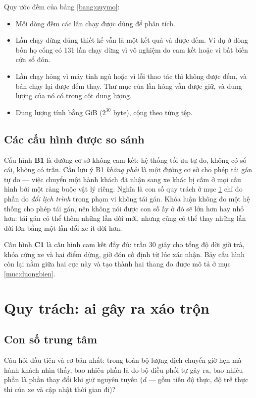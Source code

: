 Quy ước đếm của bảng \ref{bang:quymo}:
\begin{itemize}
\item Mỗi dòng đếm các lần chạy được dùng để phân tích.
\item Lần chạy dừng đúng thiết kế vẫn là một kết quả và được đếm. Ví dụ ở dòng bốn họ cổng có 131 lần
chạy dừng vì vô nghiệm do cam kết hoặc vì bất biến cửa sổ đón.
\item Lần chạy hỏng vì máy tính ngủ hoặc vì lỗi thao tác thì không được đếm, và bản chạy lại được đếm
thay. Thư mục của lần hỏng vẫn được giữ, và dung lượng của nó có trong cột dung lượng.
\item Dung lượng tính bằng GiB ($2^{30}$ byte), cộng theo từng tệp.
\end{itemize}

\subsection{Các cấu hình được so sánh}

Cấu hình \textbf{B1} là đường cơ sở không cam kết: hệ thống tối ưu tự do, không có sổ cái, không
có trần. Cần lưu ý B1 \emph{không phải} là một đường cơ sở cho phép tái gán tự do --- việc
chuyển một hành khách đã nhận sang xe khác bị cấm ở mọi cấu hình bởi một ràng buộc vật lý riêng.
Nghĩa là con số quy trách ở mục \ref{muc:quytrach} chỉ đo phần do \emph{đổi lịch trình} trong phạm vi
không tái gán. Khóa luận không đo một hệ thống cho phép tái gán, nên không nói được con số ấy ở đó
sẽ lớn hơn hay nhỏ hơn: tái gán có thể thêm những lần dời mới, nhưng cũng có thể thay những lần dời
lớn bằng một lần đổi xe ít dời hơn.

Cấu hình \textbf{C1} là cấu hình cam kết đầy đủ: trần 30 giây cho tổng độ dời giờ trả, khóa cứng
xe và hai điểm dừng, giờ đón cố định từ lúc xác nhận. Bảy cấu hình còn lại nằm giữa hai cực này
và tạo thành hai thang đo được mô tả ở mục \ref{muc:duongbien}.

\section{Quy trách: ai gây ra xáo trộn}
\label{muc:quytrach}

\subsection{Con số trung tâm}

Câu hỏi đầu tiên và cơ bản nhất: trong toàn bộ lượng dịch chuyển giờ hẹn mà hành khách nhìn
thấy, bao nhiêu phần là do bộ điều phối tự gây ra, bao nhiêu phần là phần thay đổi khi giữ nguyên
tuyến ($d$ --- gồm tiến độ thực, độ trễ thực thi của xe và cập nhật thời gian đi)?

